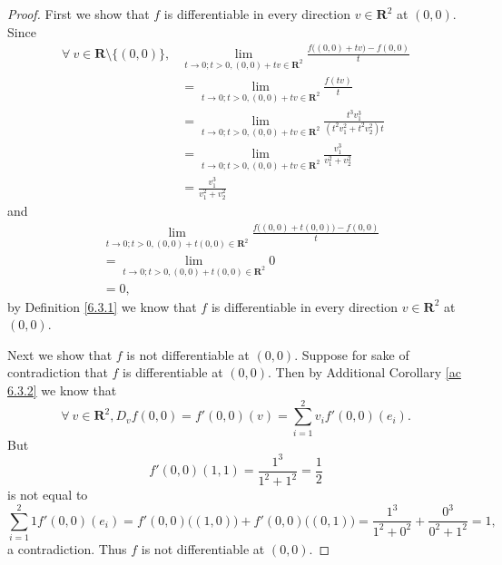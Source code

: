 \begin{proof}
    First we show that \(f\) is differentiable in every direction \(v \in \mathbf{R}^2\) at \((0, 0)\).
    Since
    \begin{align*}
        \forall\ v \in \mathbf{R} \setminus \{(0, 0)\}, & \lim_{t \to 0 ; t > 0, (0, 0) + tv \in \mathbf{R}^2} \frac{f\big((0, 0) + tv\big) - f(0, 0)}{t}    \\
                                                        & = \lim_{t \to 0 ; t > 0, (0, 0) + tv \in \mathbf{R}^2} \frac{f(tv)}{t}                             \\
                                                        & = \lim_{t \to 0 ; t > 0, (0, 0) + tv \in \mathbf{R}^2} \frac{t^3 v_1^3}{(t^2 v_1^2 + t^2 v_2^2) t} \\
                                                        & = \lim_{t \to 0 ; t > 0, (0, 0) + tv \in \mathbf{R}^2} \frac{v_1^3}{v_1^2 + v_2^2}                 \\
                                                        & = \frac{v_1^3}{v_1^2 + v_2^2}
    \end{align*}
    and
    \begin{align*}
         & \lim_{t \to 0 ; t > 0, (0, 0) + t (0, 0) \in \mathbf{R}^2} \frac{f\big((0, 0) + t(0, 0)\big) - f(0, 0)}{t} \\
         & = \lim_{t \to 0 ; t > 0, (0, 0) + t (0, 0) \in \mathbf{R}^2} 0                                             \\
         & = 0,
    \end{align*}
    by Definition \ref{6.3.1} we know that \(f\) is differentiable in every direction \(v \in \mathbf{R}^2\) at \((0, 0)\).

    Next we show that \(f\) is not differentiable at \((0, 0)\).
    Suppose for sake of contradiction that \(f\) is differentiable at \((0, 0)\).
    Then by Additional Corollary \ref{ac 6.3.2} we know that
    \[
        \forall\ v \in \mathbf{R}^2, D_v f(0, 0) = f'(0, 0)(v) = \sum_{i = 1}^2 v_i f'(0, 0)(e_i).
    \]
    But
    \[
        f'(0, 0)(1, 1) = \frac{1^3}{1^2 + 1^2} = \frac{1}{2}
    \]
    is not equal to
    \[
        \sum_{i = 1}^2 1 f'(0, 0)(e_i) = f'(0, 0)\big((1, 0)\big) + f'(0, 0)\big((0, 1)\big) = \frac{1^3}{1^2 + 0^2} + \frac{0^3}{0^2 + 1^2} = 1,
    \]
    a contradiction.
    Thus \(f\) is not differentiable at \((0, 0)\).


\end{proof}
